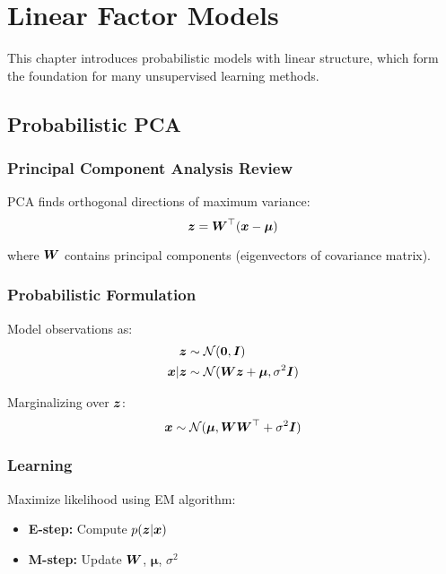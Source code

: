 
\chapter{Linear Factor Models}
\label{chap:linear-factor-models}

This chapter introduces probabilistic models with linear structure, which form the foundation for many unsupervised learning methods.

\section{Probabilistic PCA}
\label{sec:prob-pca}

\subsection{Principal Component Analysis Review}

PCA finds orthogonal directions of maximum variance:
\begin{equation}
\boldsymbol{z} = \boldsymbol{W}^\top (\boldsymbol{x} - \boldsymbol{\mu})
\end{equation}

where $\boldsymbol{W}$ contains principal components (eigenvectors of covariance matrix).

\subsection{Probabilistic Formulation}

Model observations as:
\begin{align}
\boldsymbol{z} &\sim \mathcal{N}(\boldsymbol{0}, \boldsymbol{I}) \\
\boldsymbol{x} | \boldsymbol{z} &\sim \mathcal{N}(\boldsymbol{W}\boldsymbol{z} + \boldsymbol{\mu}, \sigma^2 \boldsymbol{I})
\end{align}

Marginalizing over $\boldsymbol{z}$:
\begin{equation}
\boldsymbol{x} \sim \mathcal{N}(\boldsymbol{\mu}, \boldsymbol{W}\boldsymbol{W}^\top + \sigma^2 \boldsymbol{I})
\end{equation}

\subsection{Learning}

Maximize likelihood using EM algorithm:
\begin{itemize}
    \item \textbf{E-step:} Compute $p(\boldsymbol{z}|\boldsymbol{x})$
    \item \textbf{M-step:} Update $\boldsymbol{W}$, $\boldsymbol{\mu}$, $\sigma^2$
\end{itemize}

